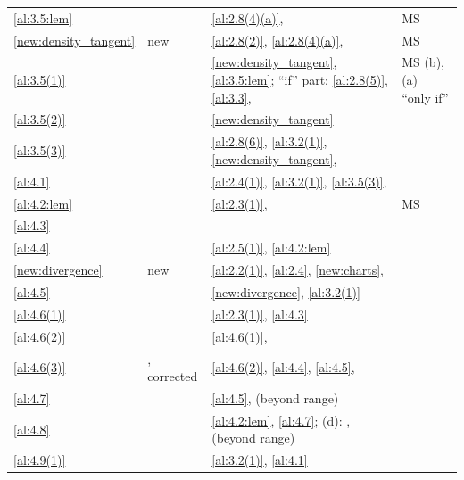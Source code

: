 \documentclass[a4paper,twoside,leqno]{article}
\begin{document}
\begin{center}
\begin{longtable}{p{}p{}p{}p{}}
\ref{al:3.5:lem} & \cite[3.5]{Allard1972} & \ref{al:2.8(4)(a)}, \cite[2.2.3, 2.3.2]{Federer1969} & MS \\
\ref{new:density_tangent} & new & \ref{al:2.8(2)}, \ref{al:2.8(4)(a)}, \cite[2.8.18, 2.9.9]{Federer1969} & MS \\
\ref{al:3.5(1)} & \cite[3.5(1)]{Allard1972} & \ref{new:density_tangent}, \ref{al:3.5:lem}; ``if'' part: \ref{al:2.8(5)}, \ref{al:3.3}, \cite[2.3.3]{Federer1969} & MS (b), (a) ``only if'' \\
\ref{al:3.5(2)} & \cite[3.5(2)]{Allard1972} & \ref{new:density_tangent} &  \\
\ref{al:3.5(3)} & \cite[3.5(3)]{Allard1972} & \ref{al:2.8(6)}, \ref{al:3.2(1)}, \ref{new:density_tangent}, \cite[3.2.20, 3.2.22]{Federer1969} &  \\
\ref{al:4.1} & \cite[4.1]{Allard1972} & \ref{al:2.4(1)}, \ref{al:3.2(1)}, \ref{al:3.5(3)}, \cite[2.4.9]{Federer1969} &  \\
\ref{al:4.2:lem} & \cite[4.2]{Allard1972} & \ref{al:2.3(1)}, \cite[2.3.2, 4.1.5]{Federer1969} & MS \\
\ref{al:4.3} & \cite[4.3(1)--(5)]{Allard1972} & \cite[2.5.12, 2.8.18, 2.9.2, 2.9.5, 2.9.7, 2.9.10, 4.1.5]{Federer1969} &  \\
\ref{al:4.4} & \cite[4.4(1)]{Allard1972} & \ref{al:2.5(1)}, \ref{al:4.2:lem} &  \\
\ref{new:divergence} & new & \ref{al:2.2(1)}, \ref{al:2.4}, \ref{new:charts}, \cite[2.6.2, 3.2.3, 3.2.5]{Federer1969} &  \\
\ref{al:4.5} & \cite[4.5]{Allard1972} & \ref{new:divergence}, \ref{al:3.2(1)} &  \\
\ref{al:4.6(1)} & \cite[4.6(1)]{Allard1972} & \ref{al:2.3(1)}, \ref{al:4.3} &  \\
\ref{al:4.6(2)} & \cite[4.6(2)]{Allard1972} & \ref{al:4.6(1)}, \cite[3.1.19]{Federer1969} &  \\
\ref{al:4.6(3)} & \cite[4.6(3)]{Allard1972}, corrected & \ref{al:4.6(2)}, \ref{al:4.4}, \ref{al:4.5}, \cite[3.2.3, 3.2.5, 4.1.4]{Federer1969} &  \\
\ref{al:4.7} & \cite[4.7]{Allard1972} & \ref{al:4.5}, \cite[4.5.5, 4.5.6, 4.5.11, 4.5.12]{Federer1969} (beyond range) &  \\
\ref{al:4.8} & \cite[4.8(1)--(4)]{Allard1972} & \ref{al:4.2:lem}, \ref{al:4.7}; (d): \cite[4.1.9]{Federer1969}, \cite[4.2]{Federer1969} (beyond range) &  \\
\ref{al:4.9(1)} & \cite[4.9]{Allard1972} & \ref{al:3.2(1)}, \ref{al:4.1} &  \\

\end{longtable}
\end{center}
\end{document}
